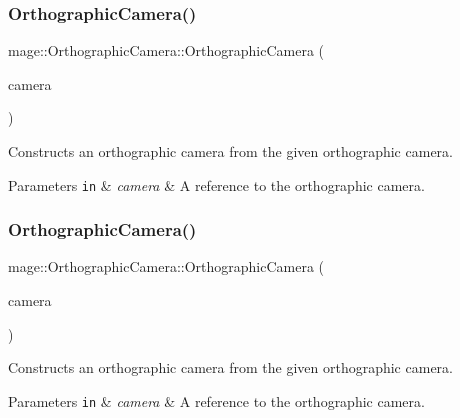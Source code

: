 \subsubsection{\texorpdfstring{Orthographic\+Camera()}{OrthographicCamera()}\hspace{0.1cm}{\footnotesize\ttfamily [2/3]}}
{\footnotesize\ttfamily mage\+::\+Orthographic\+Camera\+::\+Orthographic\+Camera (\begin{DoxyParamCaption}\item[{const \hyperlink{classmage_1_1_orthographic_camera}{Orthographic\+Camera} \&}]{camera }\end{DoxyParamCaption})\hspace{0.3cm}{\ttfamily [default]}}

Constructs an orthographic camera from the given orthographic camera.


\begin{DoxyParams}[1]{Parameters}
\mbox{\tt in}  & {\em camera} & A reference to the orthographic camera. \\
\hline
\end{DoxyParams}
\hypertarget{classmage_1_1_orthographic_camera_a6abe78fc17b583046b30a459f9ef07ef}{}\label{classmage_1_1_orthographic_camera_a6abe78fc17b583046b30a459f9ef07ef} 
\subsubsection{\texorpdfstring{Orthographic\+Camera()}{OrthographicCamera()}\hspace{0.1cm}{\footnotesize\ttfamily [3/3]}}
{\footnotesize\ttfamily mage\+::\+Orthographic\+Camera\+::\+Orthographic\+Camera (\begin{DoxyParamCaption}\item[{\hyperlink{classmage_1_1_orthographic_camera}{Orthographic\+Camera} \&\&}]{camera }\end{DoxyParamCaption})\hspace{0.3cm}{\ttfamily [default]}}

Constructs an orthographic camera from the given orthographic camera.


\begin{DoxyParams}[1]{Parameters}
\mbox{\tt in}  & {\em camera} & A reference to the orthographic camera. \\
\hline
\end{DoxyParams}
\hypertarget{classmage_1_1_orthographic_camera_abdad923634e17f217ba975a9149f6c57}{}\label{classmage_1_1_orthographic_camera_abdad923634e17f217ba975a9149f6c57} 
